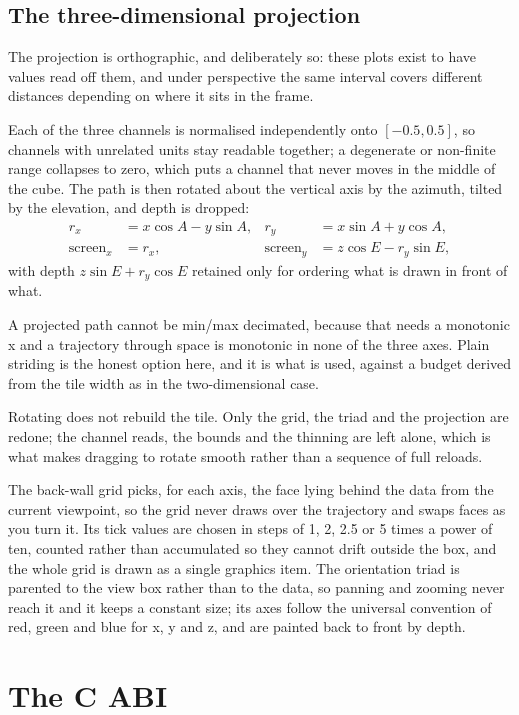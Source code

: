 \documentclass[11pt,a4paper,oneside]{report}
\begin{document}
\section{The three-dimensional projection}

The projection is orthographic, and deliberately so: these plots exist to have
values read off them, and under perspective the same interval covers different
distances depending on where it sits in the frame.

Each of the three channels is normalised independently onto $[-0.5, 0.5]$, so
channels with unrelated units stay readable together; a degenerate or non-finite
range collapses to zero, which puts a channel that never moves in the middle of
the cube. The path is then rotated about the vertical axis by the azimuth,
tilted by the elevation, and depth is dropped:
\begin{align*}
  r_x &= x \cos A - y \sin A, & r_y &= x \sin A + y \cos A, \\
  \text{screen}_x &= r_x, & \text{screen}_y &= z \cos E - r_y \sin E,
\end{align*}
with depth $z \sin E + r_y \cos E$ retained only for ordering what is drawn in
front of what.

A projected path cannot be min/max decimated, because that needs a monotonic x
and a trajectory through space is monotonic in none of the three axes. Plain
striding is the honest option here, and it is what is used, against a budget
derived from the tile width as in the two-dimensional case.

Rotating does not rebuild the tile. Only the grid, the triad and the projection
are redone; the channel reads, the bounds and the thinning are left alone, which
is what makes dragging to rotate smooth rather than a sequence of full reloads.

The back-wall grid picks, for each axis, the face lying behind the data from the
current viewpoint, so the grid never draws over the trajectory and swaps faces
as you turn it. Its tick values are chosen in steps of 1, 2, 2.5 or 5 times a
power of ten, counted rather than accumulated so they cannot drift outside the
box, and the whole grid is drawn as a single graphics item. The orientation
triad is parented to the view box rather than to the data, so panning and
zooming never reach it and it keeps a constant size; its axes follow the
universal convention of red, green and blue for x, y and z, and are painted back
to front by depth.

\chapter{The C ABI}
\label{ch:abi}
\end{document}
